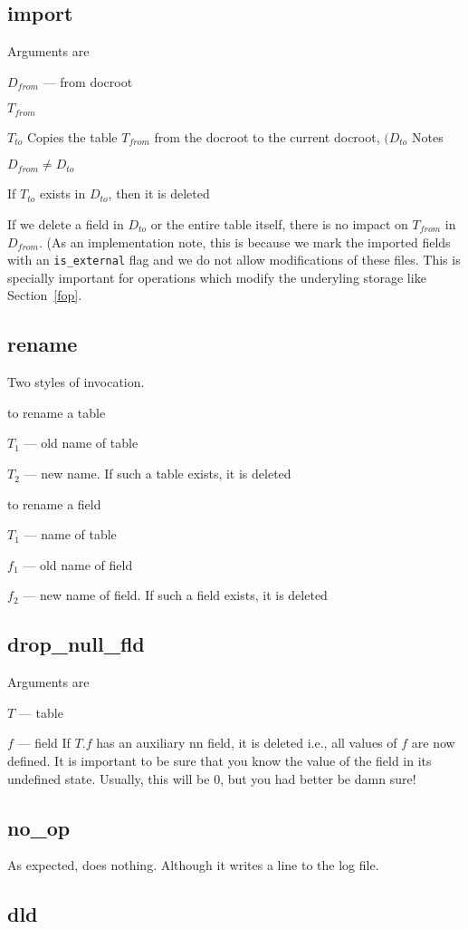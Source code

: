 \subsection{import}
\label{import}
Arguments are
\be
\item \(D_{from}\) --- from docroot 
\item \(T_{from}\)
\item \(T_{to}\)
\ee
Copies the table \(T_{from}\) from the docroot to the current docroot,
       \((D_{to}\)
Notes
\be
\item \(D_{from} \neq D_{to}\)
\item If \(T_{to}\) exists in \(D_{to}\), then it is deleted
\item If we delete a field in \(D_{to}\) or the entire table itself,
there is no impact on \(T_{from}\) in \(D_{from}\). (As an
  implementation note, this is because we mark the imported fields with
  an \verb+is_external+ flag and we do not allow modifications of these
  files. This is specially important for operations which modify the
  underyling storage like Section~\ref{fop}.
\ee

\subsection{rename}
\label{rename}
Two styles of invocation. 
\be
\item to rename a table 
\be
\item \(T_1\) --- old name of table
\item \(T_2\) --- new name. If such a table exists, it is deleted
\ee
\item to rename a field 
\be
\item \(T_1\) --- name of table
\item \(f_1\) --- old name of field 
\item \(f_2\) --- new name of field. If such a field exists, it is
deleted
\ee
\ee

\subsection{drop\_null\_fld}
\label{drop_null_fld}
Arguments are 
\be
\item \(T\) --- table
\item \(f\) --- field
\ee
If \(T.f\) has an auxiliary nn field, it is deleted i.e., all values of
\(f\) are now defined. It is important to be sure that you know the
value of the field in its undefined state. Usually, this will be 0, but
you had better be damn sure!

\subsection{no\_op}
\label{no_op}

As expected, does nothing. Although it writes a line to the log file. 

\subsection{dld}
\label{dld}

\TBC
